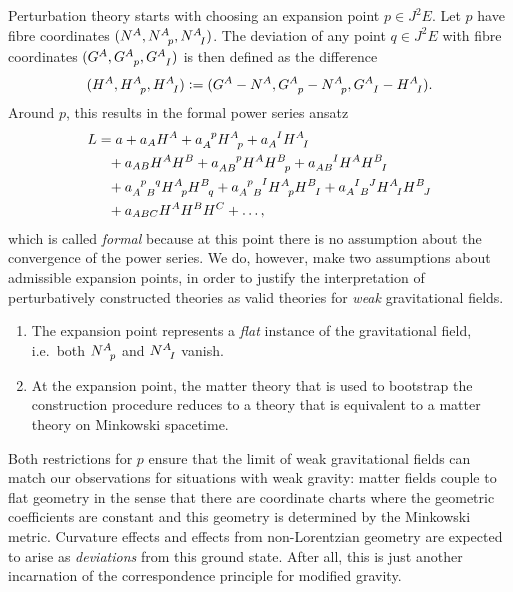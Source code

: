 Perturbation theory starts with choosing an expansion point $p\in J^2E$. Let $p$ have fibre coordinates $(N^A,N^A_{\hphantom Ap},N^A_{\hphantom AI})$. The deviation of any point $q\in J^2E$ with fibre coordinates $(G^A,G^A_{\hphantom Ap},G^A_{\hphantom AI})$ is then defined as the difference
\begin{equation}
  (H^A, H^A_{\hphantom Ap}, H^A_{\hphantom AI}) \vcentcolon= (G^A - N^A, G^A_{\hphantom Ap} - N^A_{\hphantom Ap}, G^A_{\hphantom AI} - H^A_{\hphantom AI}).
\end{equation}
Around $p$, this results in the formal power series ansatz
\begin{equation}\label{power_series_ansatz}
  \begin{aligned}
    L &{} = a + a_A H^A + a_A^{\hphantom Ap} H^A_{\hphantom Ap} + a_A^{\hphantom AI} H^A_{\hphantom AI} \\
      &{} \hphantom{=} + a_{AB} H^A H^B + a_{AB}^{\hphantom{AB}p} H^A H^B_{\hphantom Bp} + a_{AB}^{\hphantom{AB}I} H^A H^B_{\hphantom BI} \\
      &{} \hphantom{=} + a_{A\hphantom{p}B}^{\hphantom Ap\hphantom{B}q} H^A_{\hphantom Ap} H^B_{\hphantom Bq} + a_{A\hphantom{p}B}^{\hphantom Ap\hphantom{B}I} H^A_{\hphantom Ap} H^B_{\hphantom BI} + a_{A\hphantom{I}B}^{\hphantom AI\hphantom{B}J} H^A_{\hphantom AI} H^B_{\hphantom BJ} \\
      &{} \hphantom{=} + a_{ABC} H^A H^B H^C + \dots,
  \end{aligned}
\end{equation}
which is called \emph{formal} because at this point there is no assumption about the convergence of the power series. We do, however, make two assumptions about admissible expansion points, in order to justify the interpretation of perturbatively constructed theories as valid theories for \emph{weak} gravitational fields.
\begin{enumerate}
  \item{The expansion point represents a \emph{flat} instance of the gravitational field, i.e.\ both $N^A_{\hphantom Ap}$ and $N^A_{\hphantom AI}$ vanish.}
  \item{At the expansion point, the matter theory that is used to bootstrap the construction procedure reduces to a theory that is equivalent to a matter theory on Minkowski spacetime.}
\end{enumerate}
Both restrictions for $p$ ensure that the limit of weak gravitational fields can match our observations for situations with weak gravity: matter fields couple to flat geometry in the sense that there are coordinate charts where the geometric coefficients are constant and this geometry is determined by the Minkowski metric. Curvature effects and effects from non-Lorentzian geometry are expected to arise as \emph{deviations} from this ground state. After all, this is just another incarnation of the correspondence principle for modified gravity.

